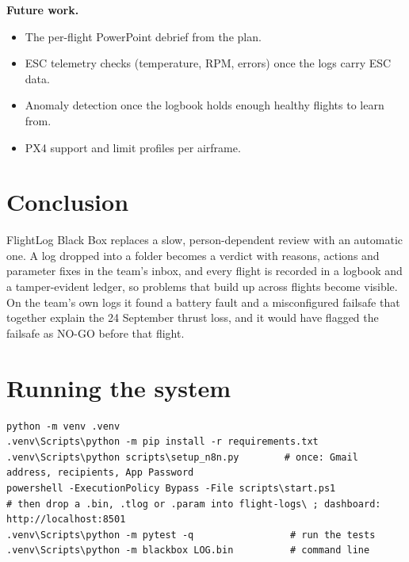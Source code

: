 \documentclass[11pt,a4paper]{article}
\newcommand{\code}[1]{\texttt{\detokenize{#1}}}
\begin{document}
\textbf{Future work.}
\begin{itemize}
  \item The per-flight PowerPoint debrief from the plan.
  \item ESC telemetry checks (temperature, RPM, errors) once the logs carry ESC data.
  \item Anomaly detection once the logbook holds enough healthy flights to learn from.
  \item PX4 \code{.ulg} support and limit profiles per airframe.
\end{itemize}

\section{Conclusion}
FlightLog Black Box replaces a slow, person-dependent review with an automatic one. A log dropped into a folder
becomes a verdict with reasons, actions and parameter fixes in the team's inbox, and every flight is recorded in a
logbook and a tamper-evident ledger, so problems that build up across flights become visible. On the team's own
logs it found a battery fault and a misconfigured failsafe that together explain the 24 September thrust loss,
and it would have flagged the failsafe as NO-GO before that flight.

\appendix
\section{Running the system}
\begin{lstlisting}
python -m venv .venv
.venv\Scripts\python -m pip install -r requirements.txt
.venv\Scripts\python scripts\setup_n8n.py        # once: Gmail address, recipients, App Password
powershell -ExecutionPolicy Bypass -File scripts\start.ps1
# then drop a .bin, .tlog or .param into flight-logs\ ; dashboard: http://localhost:8501
.venv\Scripts\python -m pytest -q                 # run the tests
.venv\Scripts\python -m blackbox LOG.bin          # command line
\end{lstlisting}
\end{document}
